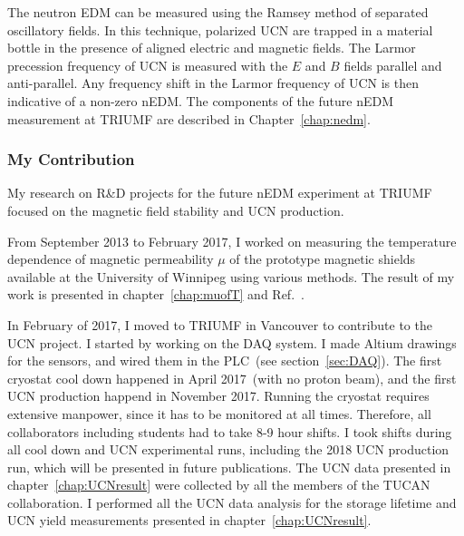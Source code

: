 The neutron EDM can be measured using the Ramsey method of separated
oscillatory fields. In this technique, polarized UCN are trapped in a
material bottle in the presence of aligned electric and magnetic
fields. The Larmor precession frequency of UCN is measured with the
$E$ and $B$ fields parallel and anti-parallel. Any frequency shift in
the Larmor frequency of UCN is then indicative of a non-zero nEDM. The
components of the future nEDM measurement at TRIUMF are described in
Chapter~\ref{chap:nedm}.

\subsubsection{My Contribution}
My research on R\&D projects for the future nEDM experiment at TRIUMF
focused on the magnetic field stability and UCN production.

From September 2013 to February 2017, I worked on measuring the
temperature dependence of magnetic permeability $\mu$ of the prototype
magnetic shields available at the University of Winnipeg using various
methods. The result of my work is presented in
chapter~\ref{chap:muofT} and Ref.~\cite{Andalib:2016ahj}.

In February of 2017, I moved to TRIUMF in Vancouver to contribute to
the UCN project. I started by working on the DAQ system. I made Altium
drawings for the sensors, and wired them in the PLC~(see
section~\ref{sec:DAQ}).  The first cryostat cool down happened in
April 2017~(with no proton beam), and the first UCN production happend
in November 2017.  Running the cryostat requires extensive manpower,
since it has to be monitored at all times. Therefore, all
collaborators including students had to take 8-9 hour shifts. I took
shifts during all cool down and UCN experimental runs, including the
2018 UCN production run, which will be presented in future
publications. The UCN data presented in chapter~\ref{chap:UCNresult}
were collected by all the members of the TUCAN collaboration. I
performed all the UCN data analysis for the storage lifetime and UCN
yield measurements presented in chapter~\ref{chap:UCNresult}.
